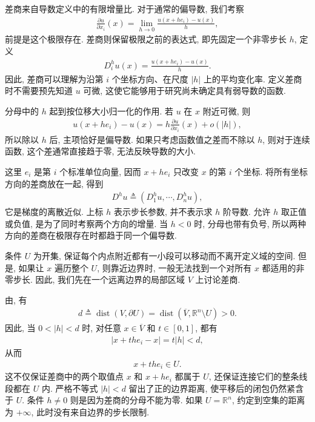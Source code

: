 \documentclass[../../main.tex]{subfiles}
\begin{document}
\begin{remark}
差商来自导数定义中的有限增量比. 对于通常的偏导数, 我们考察
\begin{align*}
\frac{\partial u}{\partial x_i}(x)
=
\lim\limits_{h\to0}
\frac{u(x+he_i)-u(x)}{h},
\end{align*}
前提是这个极限存在. 差商则保留极限之前的表达式, 即先固定一个非零步长 $h$, 定义
\begin{align*}
D_i^h u(x)
=
\frac{u(x+he_i)-u(x)}{h}.
\end{align*}
因此, 差商可以理解为沿第 $i$ 个坐标方向、在尺度 $|h|$ 上的平均变化率.
定义差商时不需要预先知道 $u$ 可微, 这使它能够用于研究尚未确定具有弱导数的函数.

分母中的 $h$ 起到按位移大小归一化的作用. 若 $u$ 在 $x$ 附近可微, 则
\begin{align*}
u(x+he_i)-u(x)
=
h\frac{\partial u}{\partial x_i}(x)+o(|h|),
\end{align*}
所以除以 $h$ 后, 主项恰好是偏导数. 如果只考虑函数值之差而不除以 $h$, 则对于连续函数, 这个差通常直接趋于零, 无法反映导数的大小.

这里 $e_i$ 是第 $i$ 个标准单位向量, 因而 $x+he_i$ 只改变 $x$ 的第 $i$ 个坐标. 将所有坐标方向的差商放在一起, 得到
\begin{align*}
D^h u
\triangleq
(D_1^h u,\cdots,D_n^h u),
\end{align*}
它是梯度的离散近似. 上标 $h$ 表示步长参数, 并不表示求 $h$ 阶导数.
允许 $h$ 取正值或负值, 是为了同时考察两个方向的增量. 当 $h<0$ 时, 分母也带有负号, 所以两种方向的差商在极限存在时都趋于同一个偏导数.

条件 $U$ 为开集, 保证每个内点附近都有一小段可以移动而不离开定义域的空间.
但是, 如果让 $x$ 遍历整个 $U$, 则靠近边界时, 一般无法找到一个对所有 $x$ 都适用的非零步长.
因此, 我们先在一个远离边界的局部区域 $V$ 上讨论差商.

由, 有
\begin{align*}
d
\triangleq
\operatorname{dist}(V,\partial U)
=
\operatorname{dist}(\overline{V},\mathbb{R}^n\setminus U)
>0.
\end{align*}
因此, 当 $0<|h|<d$ 时, 对任意 $x\in\overline{V}$ 和 $t\in[0,1]$, 都有
\begin{align*}
|x+the_i-x|
=
t|h|
<d,
\end{align*}
从而
\begin{align*}
x+the_i\in U.
\end{align*}
这不仅保证差商中的两个取值点 $x$ 和 $x+he_i$ 都属于 $U$, 还保证连接它们的整条线段都在 $U$ 内.
严格不等式 $|h|<d$ 留出了正的边界距离, 使平移后的闭包仍然紧含于 $U$.
条件 $h\neq0$ 则是因为差商的分母不能为零.
如果 $U=\mathbb{R}^n$, 约定到空集的距离为 $+\infty$, 此时没有来自边界的步长限制.


\end{remark}
\end{document}
